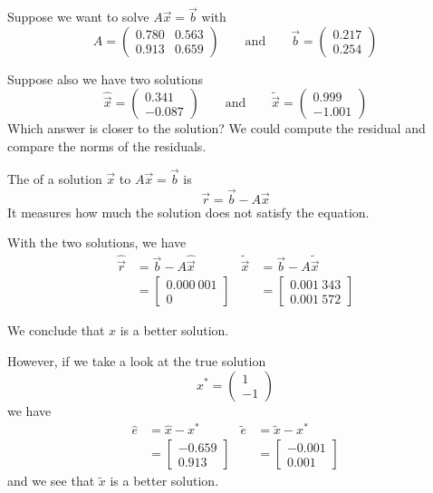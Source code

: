 Suppose we want to solve \( A \vec{x} = \vec{b} \) with \[
    A = \begin{pmatrix}
        0.780 & 0.563 \\ 0.913 & 0.659
    \end{pmatrix}
    \qquad \text{and} \qquad
    \vec{b} = \begin{pmatrix}
        0.217 \\ 0.254
    \end{pmatrix}
\]

Suppose also we have two solutions \[
    \hat{\vec{x}} = \begin{pmatrix}
        0.341 \\ -0.087
    \end{pmatrix}
    \qquad \text{and} \qquad
    \tilde{\vec{x}} = \begin{pmatrix}
        0.999 \\ -1.001
    \end{pmatrix}
\]
Which answer is closer to the solution? We could compute the residual and compare the norms of the residuals.

\begin{definition}[Residual]
    The  of a solution \( \vec{x} \) to \( A \vec{x} = \vec{b} \) is \[
        \vec{r} = \vec{b} - A \vec{x}
    \] It measures how much the solution does not satisfy the equation.
\end{definition}

With the two solutions, we have
\begin{align*}
    \hat{\vec{r}}
     & = \vec{b} - A \hat{\vec{x}}
     &
    \tilde{\vec{x}}
     & = \vec{b} - A \tilde{\vec{x}}
    \\
     & = \begin{bmatrix}
             0.000~001 \\ 0
         \end{bmatrix}
     &
     & = \begin{bmatrix}
             0.001~343 \\ 0.001~572
         \end{bmatrix}
\end{align*}

We conclude that \( \hat{x} \) is a better solution.

However, if we take a look at the true solution \[
    x^\ast = \begin{pmatrix} 1 \\ -1 \end{pmatrix}
\] we have
\begin{align*}
    \hat{e}
     & = \hat{x} - x^\ast
     &
    \tilde{e}
     & = \tilde{x} - x^\ast
    \\
     & = \begin{bmatrix}
             -0.659 \\ 0.913
         \end{bmatrix}
     &
     & = \begin{bmatrix}
             -0.001 \\ 0.001
         \end{bmatrix}
\end{align*}
and we see that \( \tilde{x} \) is a better solution.

